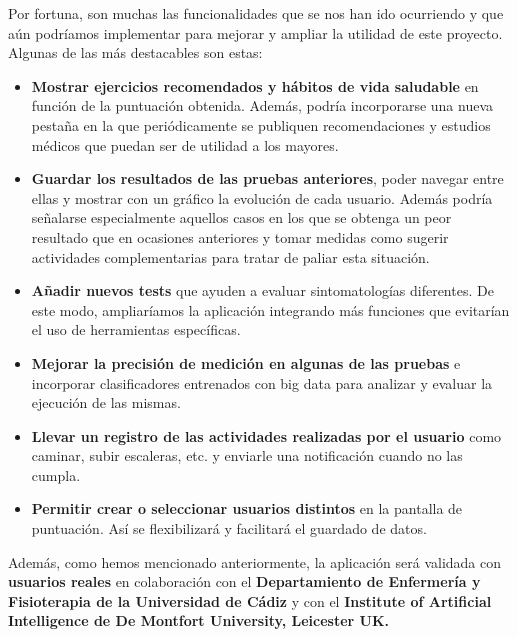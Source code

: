 Por fortuna, son muchas las funcionalidades que se nos han ido ocurriendo y que aún podríamos implementar para mejorar y ampliar la utilidad de este proyecto. Algunas de las más destacables son estas:

\begin{itemize}
    \item \textbf{Mostrar ejercicios recomendados y hábitos de vida saludable} en función de la puntuación obtenida. Además, podría incorporarse una nueva pestaña en la que periódicamente se publiquen recomendaciones y estudios médicos que puedan ser de utilidad a los mayores. 
    
    \item \textbf{Guardar los resultados de las pruebas anteriores}, poder navegar entre ellas y mostrar con un gráfico la evolución de cada usuario. Además podría señalarse especialmente aquellos casos en los que se obtenga un peor resultado que en ocasiones anteriores y tomar medidas como sugerir actividades complementarias para tratar de paliar esta situación.
    
    \item \textbf{Añadir nuevos tests} que ayuden a evaluar sintomatologías diferentes. De este modo, ampliaríamos la aplicación integrando más funciones que evitarían el uso de herramientas específicas.
    
    \item \textbf{Mejorar la precisión de medición en algunas de las pruebas} e incorporar clasificadores entrenados con big data para analizar y evaluar la ejecución de las mismas.
    
    \item \textbf{Llevar un registro de las actividades realizadas por el usuario} como caminar, subir escaleras, etc. y enviarle una notificación cuando no las cumpla.
    
    \item \textbf{Permitir crear o seleccionar usuarios distintos} en la pantalla de puntuación. Así se flexibilizará y facilitará el guardado de datos.
\end{itemize}

Además, como hemos mencionado anteriormente, la aplicación será validada con \textbf{usuarios reales} en colaboración con el \textbf{Departamiento de Enfermería y Fisioterapia de la Universidad de Cádiz} y con el \textbf{Institute of Artificial Intelligence de De Montfort University, Leicester UK.}